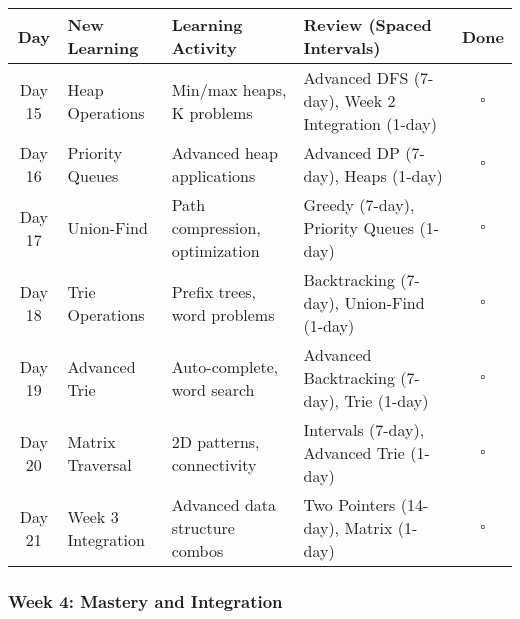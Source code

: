 \documentclass[10pt,a4paper]{article}
\begin{document}
\begin{table}[h]
\centering
\small
\begin{tabular}{|c|p{3cm}|p{4cm}|p{4cm}|c|}
\hline
\textbf{Day} & \textbf{New Learning} & \textbf{Learning Activity} & \textbf{Review (Spaced Intervals)} & \textbf{Done} \\
\hline
Day 15 & Heap Operations & Min/max heaps, K problems & Advanced DFS (7-day), Week 2 Integration (1-day) & $\square$ \\
\hline
Day 16 & Priority Queues & Advanced heap applications & Advanced DP (7-day), Heaps (1-day) & $\square$ \\
\hline
Day 17 & Union-Find & Path compression, optimization & Greedy (7-day), Priority Queues (1-day) & $\square$ \\
\hline
Day 18 & Trie Operations & Prefix trees, word problems & Backtracking (7-day), Union-Find (1-day) & $\square$ \\
\hline
Day 19 & Advanced Trie & Auto-complete, word search & Advanced Backtracking (7-day), Trie (1-day) & $\square$ \\
\hline
Day 20 & Matrix Traversal & 2D patterns, connectivity & Intervals (7-day), Advanced Trie (1-day) & $\square$ \\
\hline
Day 21 & Week 3 Integration & Advanced data structure combos & Two Pointers (14-day), Matrix (1-day) & $\square$ \\
\hline
\end{tabular}
\end{table}

\subsubsection{Week 4: Mastery and Integration}
\end{document}

